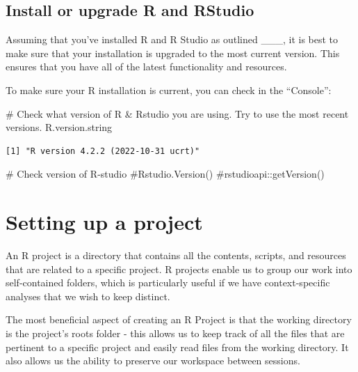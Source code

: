 \documentclass[
  letterpaper,
  DIV=11,
  numbers=noendperiod]{scrreprt}
\newenvironment{Shaded}{\begin{snugshade}}{\end{snugshade}}
\newcommand{\CommentTok}[1]{\textcolor[rgb]{0.37,0.37,0.37}{#1}}
\newcommand{\NormalTok}[1]{\textcolor[rgb]{0.00,0.23,0.31}{#1}}
\begin{document}
\hypertarget{install-or-upgrade-r-and-rstudio}{%
\section{Install or upgrade R and
RStudio}\label{install-or-upgrade-r-and-rstudio}}

Assuming that you've installed R and R Studio as outlined \_\_\_, it is
best to make sure that your installation is upgraded to the most current
version. This ensures that you have all of the latest functionality and
resources.

To make sure your R installation is current, you can check in the
``Console'':

\begin{Shaded}
\begin{Highlighting}[]
\CommentTok{\# Check what version of R \& Rstudio you are using. Try to use the most recent versions.}
\NormalTok{R.version.string}
\end{Highlighting}
\end{Shaded}

\begin{verbatim}
[1] "R version 4.2.2 (2022-10-31 ucrt)"
\end{verbatim}

\begin{Shaded}
\begin{Highlighting}[]
\CommentTok{\#   Check version of R{-}studio}
\CommentTok{\#Rstudio.Version()}
\CommentTok{\#rstudioapi::getVersion()}
\end{Highlighting}
\end{Shaded}


\hypertarget{setting-up-a-project}{%
\chapter{Setting up a project}\label{setting-up-a-project}}

An R project is a directory that contains all the contents, scripts, and
resources that are related to a specific project. R projects enable us
to group our work into self-contained folders, which is particularly
useful if we have context-specific analyses that we wish to keep
distinct.

The most beneficial aspect of creating an R Project is that the working
directory is the project's roots folder - this allows us to keep track
of all the files that are pertinent to a specific project and easily
read files from the working directory. It also allows us the ability to
preserve our workspace between sessions.
\end{document}
